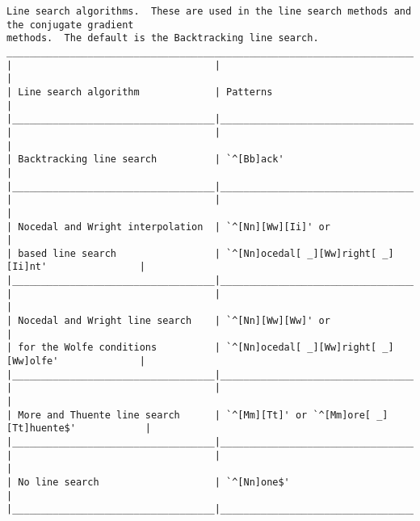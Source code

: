 {\begin{verbatim}
Line search algorithms.  These are used in the line search methods and the conjugate gradient
methods.  The default is the Backtracking line search.
___________________________________________________________________________________________
|                                   |                                                     |
| Line search algorithm             | Patterns                                            |
|___________________________________|_____________________________________________________|
|                                   |                                                     |
| Backtracking line search          | `^[Bb]ack'                                          |
|___________________________________|_____________________________________________________|
|                                   |                                                     |
| Nocedal and Wright interpolation  | `^[Nn][Ww][Ii]' or                                  |
| based line search                 | `^[Nn]ocedal[ _][Ww]right[ _][Ii]nt'                |
|___________________________________|_____________________________________________________|
|                                   |                                                     |
| Nocedal and Wright line search    | `^[Nn][Ww][Ww]' or                                  |
| for the Wolfe conditions          | `^[Nn]ocedal[ _][Ww]right[ _][Ww]olfe'              |
|___________________________________|_____________________________________________________|
|                                   |                                                     |
| More and Thuente line search      | `^[Mm][Tt]' or `^[Mm]ore[ _][Tt]huente$'            |
|___________________________________|_____________________________________________________|
|                                   |                                                     |
| No line search                    | `^[Nn]one$'                                         |
|___________________________________|_____________________________________________________|




\end{verbatim}}
